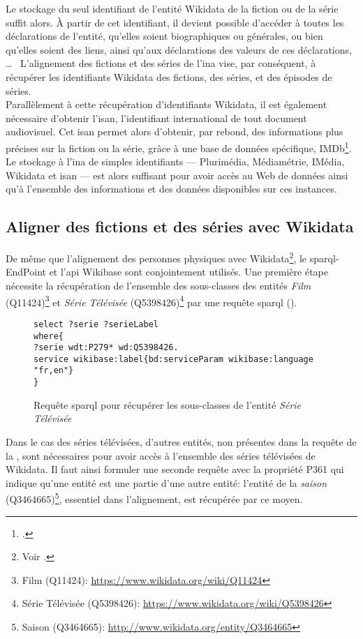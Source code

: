 Le stockage du seul identifiant de l'entité Wikidata de la fiction ou de la série suffit alors. À partir de cet identifiant, il devient possible d'accéder à toutes les déclarations de l'entité, qu'elles soient biographiques ou générales, ou bien qu'elles soient des liens, ainsi qu'aux déclarations des valeurs de ces déclarations, \dots~ L'alignement des fictions et des séries de l'\ac{ina} vise, par conséquent, à récupérer les identifiants Wikidata des fictions, des séries, et des épisodes de séries.\\

Parallèlement à cette récupération d'identifiants Wikidata, il est également nécessaire d'obtenir l'\ac{isan}, l'identifiant international de tout document audiovisuel. Cet \ac{isan} permet alors d'obtenir, par rebond, des informations plus précises sur la fiction ou la série, grâce à une base de données spécifique, IMDb\footcite{noauthor_international_nodate}. Le stockage à l'\ac{ina} de simples identifiants --- Plurimédia, Médiamétrie, IMédia, Wikidata et \ac{isan} --- est alors suffisant pour avoir accès au Web de données ainsi qu'à l'ensemble des informations et des données disponibles sur ces instances.

\subsection{\label{III-A-3-b}Aligner des fictions et des séries avec Wikidata}

De même que l'alignement des personnes physiques avec Wikidata\footnote{Voir .}, le \ac{sparql}-EndPoint et l'\ac{api} Wikibase sont conjointement utilisés. Une première étape nécessite la récupération de l'ensemble des sous-classes des entités \textit{Film} (Q11424)\footnote{Film (Q11424): \url{https://www.wikidata.org/wiki/Q11424}} et \textit{Série Télévisée} (Q5398426)\footnote{Série Télévisée (Q5398426): \url{https://www.wikidata.org/wiki/Q5398426}} par une requête \ac{sparql} ().\\
\medskip
\begin{figure}[!h]
	\centering
	\begin{verbatim}
select ?serie ?serieLabel
where{
?serie wdt:P279* wd:Q5398426.
service wikibase:label{bd:serviceParam wikibase:language "fr,en"}
}
	\end{verbatim}
	\caption{Requête \ac{sparql} pour récupérer les sous-classes de l'entité \textit{Série Télévisée}}
	\label{sparql_1}
\end{figure}
\bigskip
Dans le cas des séries télévisées, d'autres entités, non présentes dans la requête de la , sont nécessaires pour avoir accès à l'ensemble des séries télévisées de Wikidata. Il faut ainsi formuler une seconde requête avec la propriété P361 qui indique qu'une entité est \og une partie d'\fg{}une autre entité: l'entité de la \textit{saison} (Q3464665)\footnote{Saison (Q3464665): \url{http://www.wikidata.org/entity/Q3464665}}, essentiel dans l'alignement, est récupérée par ce moyen.\\

